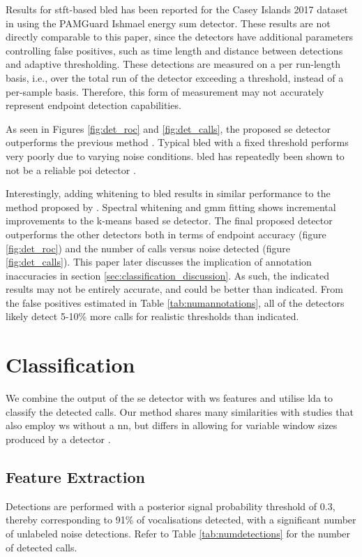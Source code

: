 {Results for \ac{stft}-based \ac{bled} has been reported for the Casey Islands 2017 dataset in \citep{casey2017} using the PAMGuard Ishmael energy sum detector. These results are not directly comparable to this paper, since the detectors have additional parameters controlling false positives, such as time length and distance between detections and adaptive thresholding. These detections are measured on a per run-length basis, i.e., over the total run of the detector exceeding a threshold, instead of a per-sample basis. Therefore, this form of measurement may not accurately represent endpoint detection capabilities. 

As seen in Figures \ref{fig:det_roc} and \ref{fig:det_calls}, the proposed \ac{se} detector outperforms the previous method \citep{mypaper}. Typical \ac{bled} with a fixed threshold performs very poorly due to varying noise conditions. \ac{bled} has repeatedly been shown to not be a reliable \ac{poi} detector \citep{jacques1, se_erbe_king}. 

Interestingly, adding whitening to \ac{bled} results in similar performance to the method proposed by \citet{mypaper}. Spectral whitening and \ac{gmm} fitting shows incremental improvements to the k-means based \ac{se} detector. The final proposed detector outperforms the other detectors both in terms of endpoint accuracy (figure \ref{fig:det_roc}) and the number of calls versus noise detected (figure \ref{fig:det_calls}). This paper later discusses the implication of annotation inaccuracies in section \ref{sec:classification_discussion}. As such, the indicated results may not be entirely accurate, and could be better than indicated. From the false positives estimated in Table \ref{tab:numannotations}, all of the detectors likely detect 5-10\% more calls for realistic thresholds than indicated.

\clearpage
\section{Classification}
\label{sec:cls}
We combine the output of the \ac{se} detector with \ac{ws} features and utilise \ac{lda} to classify the detected calls. Our method shares many similarities with studies that also employ \ac{ws} without a \ac{nn}, but differs in allowing for variable window sizes produced by a detector \citep{ws_audio, ws_ecg}.

\subsection{Feature Extraction}
Detections are performed with a posterior signal probability threshold of 0.3, thereby corresponding to 91\% of vocalisations detected, with a significant number of unlabeled noise detections. Refer to Table \ref{tab:numdetections} for the number of detected calls. 

}
